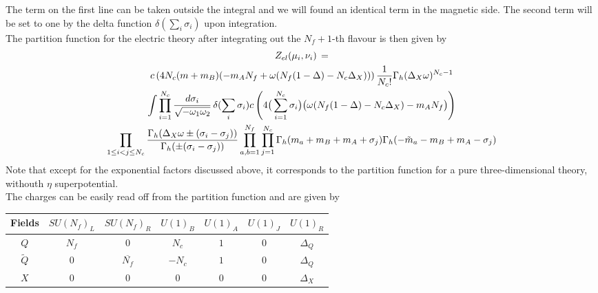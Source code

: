The term on the first line can be taken outside the integral and we will found an identical term in the magnetic side.
The second term will be set to one by the delta function $\delta(\sum_i \sigma_i)$ upon integration.\\
The partition function for the electric theory after integrating out the $N_f +1$-th flavour is then given by
\begin{multline}
 Z_{el} ( \mu_i , \nu_i )\,  =  \\
 c \left( 4 N_c  ( m  + m_B ) (-  m_A N_f   + \omega ( N_f (1 - \Delta)  - N_c \Delta_X ) ) \right) 
 {1 \over N_c ! }
\Gamma_h ( \Delta_X \omega )^{N_c-1} 
\\ \int
\prod_{i=1}^{N_c} \frac{d \sigma_i}{\sqrt{- \omega_1 \omega_2}} \, \delta( \sum_i \sigma_i)  c \left( 4\big( \sum_{i=1}^{N_c}  \sigma_i  \big) \big( \omega( N_f (1 - \Delta)  - N_c \Delta_X)  -  m_A N_f \big) \right) 
\\
   \prod_{ 1 \leq i<j \leq N_c} \frac{ \Gamma_h( \Delta_X \omega \pm (\sigma_i - \sigma_j)) }{ \Gamma_h ( \pm (\sigma_i - \sigma_j) )}
 \prod_{a,b=1}^{N_f} \prod_{j=1}^{N_c} \Gamma_h ( m_a + m_B + m_A + \sigma_j) \Gamma_h ( -\tilde{m}_a -m_B + m_A - \sigma_j)
\end{multline}
Note that except for the exponential factors discussed above, it corresponds to the partition function for a pure three-dimensional theory, withouth $\eta$ superpotential.\\
The charges can be easily read off from the partition function and are given by 
\begin{table}[h!]
 \begin{tabular}{|c |c |c |c |c |c |c |}
\hline
Fields & $SU(N_f)_L$ & $SU(N_f)_R$ & $U(1)_B$ & $U(1)_A$ & $U(1)_J$ & $U(1)_R $ \\
\hline
$Q$ & $N_f$ & 0  &$ N_c $& $1 $& 0  & $\Delta_Q$ \\
$\tilde{Q} $  & 0  &$\overline{N_f}$ & $ - N_c $& $1 $ & 0 & $\Delta_Q$ \\
$X$ & 0 & 0 & 0 & 0 &0 & $\Delta_X$ \\
\hline
\end{tabular}
\centering
\end{table}


